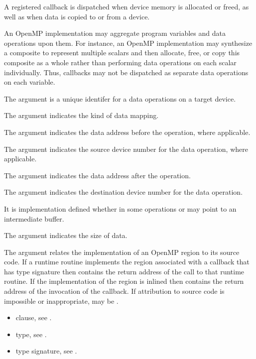 \descr
A registered  callback is dispatched when device 
memory is allocated or freed, as well as when data is copied to or from a device.

\begin{note}
An OpenMP implementation may aggregate program variables and data operations 
upon them.  For instance, an OpenMP implementation may synthesize a composite 
to represent multiple scalars and then allocate, free, or copy this composite 
as a whole rather than performing data operations on each scalar individually.  
Thus, callbacks may not be dispatched as separate data operations on each variable.
\end{note}

\argdesc
The  argument is a unique identifer for a data 
operations on a target device.

The  argument indicates the kind of data mapping.

The  argument indicates the data address before the operation, 
where applicable.

The  argument indicates the source device number
for the data operation, where applicable.

The  argument indicates the data address after the operation.

The  argument indicates the destination device
number for the data operation.

It is implementation defined whether in some operations 
or  may point to an intermediate buffer.

The  argument indicates the size of data.

The  argument relates the implementation of an OpenMP region
to its source code. If a runtime routine implements the region associated with
a callback that has type signature  then
 contains the return address of the call to that runtime routine.
If the implementation of the region is inlined then  contains the
return address of the invocation of the callback. If attribution to source code
is impossible or inappropriate, may be .

\crossreferences
\begin{itemize}
\item {} clause, see .

\item {} type, see .

\item {} type signature, see
.
\end{itemize}



